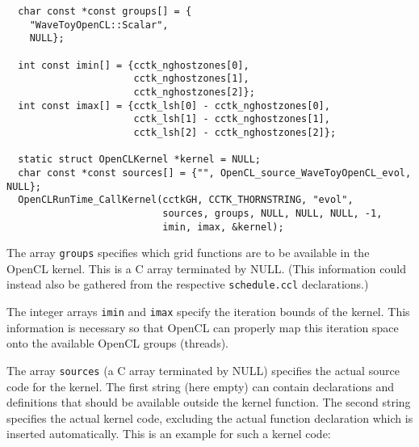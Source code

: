 \begin{verbatim}
  char const *const groups[] = {
    "WaveToyOpenCL::Scalar",
    NULL};
  
  int const imin[] = {cctk_nghostzones[0],
                      cctk_nghostzones[1],
                      cctk_nghostzones[2]};
  int const imax[] = {cctk_lsh[0] - cctk_nghostzones[0],
                      cctk_lsh[1] - cctk_nghostzones[1],
                      cctk_lsh[2] - cctk_nghostzones[2]};
  
  static struct OpenCLKernel *kernel = NULL;
  char const *const sources[] = {"", OpenCL_source_WaveToyOpenCL_evol, NULL};
  OpenCLRunTime_CallKernel(cctkGH, CCTK_THORNSTRING, "evol",
                           sources, groups, NULL, NULL, NULL, -1,
                           imin, imax, &kernel);
\end{verbatim}

The array \texttt{groups} specifies which grid functions are to be
available in the OpenCL kernel. This is a C array terminated by
NULL\@. (This information could instead also be gathered from the
respective \texttt{schedule.ccl} declarations.)

The integer arrays \texttt{imin} and \texttt{imax} specify the
iteration bounds of the kernel. This information is necessary so that
OpenCL can properly map this iteration space onto the available OpenCL
groups (threads).

The array \texttt{sources} (a C array terminated by NULL) specifies
the actual source code for the kernel. The first string (here empty)
can contain declarations and definitions that should be available
outside the kernel function. The second string specifies the actual
kernel code, excluding the actual function declaration which is
inserted automatically. This is an example for such a kernel code:

